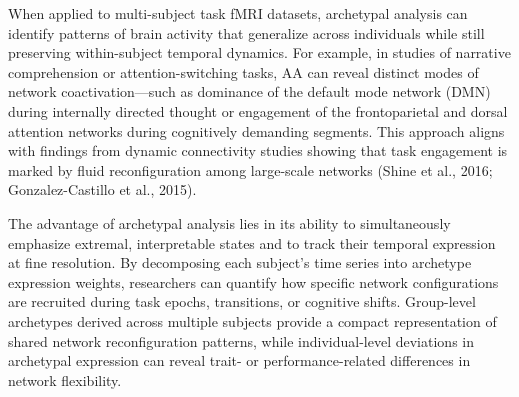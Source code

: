 \documentclass[12pt]{article}
\begin{document}
When applied to multi-subject task fMRI datasets, archetypal analysis can identify patterns of brain activity that generalize across individuals while still preserving within-subject temporal dynamics. For example, in studies of narrative comprehension or attention-switching tasks, AA can reveal distinct modes of network coactivation—such as dominance of the default mode network (DMN) during internally directed thought or engagement of the frontoparietal and dorsal attention networks during cognitively demanding segments. This approach aligns with findings from dynamic connectivity studies showing that task engagement is marked by fluid reconfiguration among large-scale networks (Shine et al., 2016; Gonzalez-Castillo et al., 2015).

The advantage of archetypal analysis lies in its ability to simultaneously emphasize extremal, interpretable states and to track their temporal expression at fine resolution. By decomposing each subject’s time series into archetype expression weights, researchers can quantify how specific network configurations are recruited during task epochs, transitions, or cognitive shifts. Group-level archetypes derived across multiple subjects provide a compact representation of shared network reconfiguration patterns, while individual-level deviations in archetypal expression can reveal trait- or performance-related differences in network flexibility.

\end{document}
